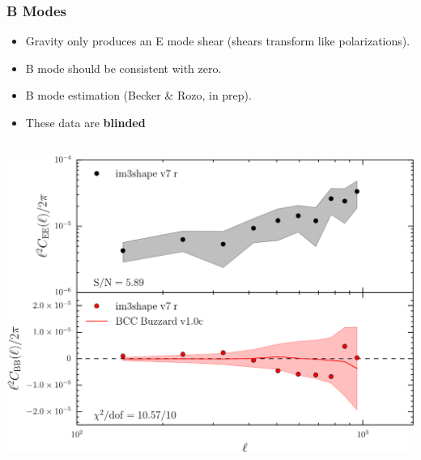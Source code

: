 \documentclass{beamer}
\begin{document}
\frame
{
    \frametitle{B Modes}

    \fontsize{9}{0.8\baselineskip}
    \begin{itemize}

        \item Gravity only produces an E mode shear (shears transform like
            polarizations).

        \item B mode should be consistent with zero.

        \item B mode estimation (Becker \& Rozo, in prep).


        \item These data are {\bf blinded}

    \end{itemize}

    \begin{columns}


        \begin{column}{0.5\textwidth}
            \begin{center}
                \includegraphics[width=1.05\textwidth]{im3shape_v7_r_crop.pdf}
            \end{center}
        \end{column}


\end{columns}}
\end{document}
